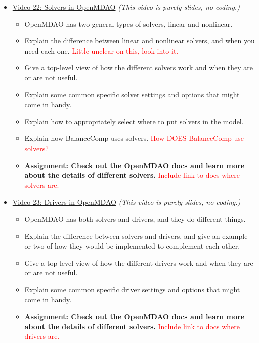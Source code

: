 \documentclass[12pt, letterpaper]{article}
\begin{document}
\begin{itemize}
	\item \underline{Video 22: Solvers in OpenMDAO} \textit{(This video is purely slides, no coding.)}
		\begin{itemize}
			\item OpenMDAO has two general types of solvers, linear and nonlinear.
			\item Explain the difference between linear and nonlinear solvers, and when you need each one. \textcolor{red}{Little unclear on this, look into it.}
			\item Give a top-level view of how the different solvers work and when they are or are not useful.
			\item Explain some common specific solver settings and options that might come in handy.
			\item Explain how to appropriately select where to put solvers in the model.
			\item Explain how BalanceComp uses solvers. \textcolor{red}{How DOES BalanceComp use solvers?}
			\item \textbf{Assignment: Check out the OpenMDAO docs and learn more about the details of different solvers.} \textcolor{red}{Include link to docs where solvers are.}
		\end{itemize}
		
	\item \underline{Video 23: Drivers in OpenMDAO} \textit{(This video is purely slides, no coding.)}
		\begin{itemize}
			\item OpenMDAO has both solvers and drivers, and they do different things.
			\item Explain the difference between solvers and drivers, and give an example or two of how they would be implemented to complement each other.
			\item Give a top-level view of how the different drivers work and when they are or are not useful.
			\item Explain some common specific driver settings and options that might come in handy.
			\item \textbf{Assignment: Check out the OpenMDAO docs and learn more about the details of different solvers.} \textcolor{red}{Include link to docs where drivers are.}
		\end{itemize}


\end{itemize}
\end{document}
